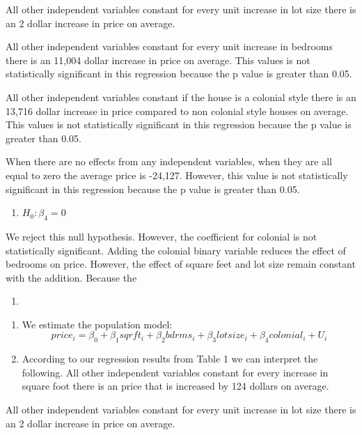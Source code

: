 \documentclass[
  12pt,
  landscape]{article}
\providecommand{\tightlist}{%
  \setlength{\itemsep}{0pt}\setlength{\parskip}{0pt}}
\begin{document}
All other independent variables constant for every unit increase in lot
size there is an 2 dollar increase in price on average.

All other independent variables constant for every unit increase in
bedrooms there is an 11,004 dollar increase in price on average. This
values is not statistically significant in this regression because the p
value is greater than 0.05.

All other independent variables constant if the house is a colonial
style there is an 13,716 dollar increase in price compared to non
colonial style houses on average. This values is not statistically
significant in this regression because the p value is greater than 0.05.

When there are no effects from any independent variables, when they are
all equal to zero the average price is -24,127. However, this value is
not statistically significant in this regression because the p value is
greater than 0.05.

\begin{enumerate}
\def\labelenumi{\roman{enumi})}
\setcounter{enumi}{2}
\tightlist
\item
  \({H_0: \beta_4 = 0}\)
\end{enumerate}

We reject this null hypothesis. However, the coefficient for colonial is
not statistically significant. Adding the colonial binary variable
reduces the effect of bedrooms on price. However, the effect of square
feet and lot size remain constant with the addition. Because the

\begin{enumerate}
\def\labelenumi{(\alph{enumi})}
\setcounter{enumi}{4}
\item
\end{enumerate}

\begin{enumerate}
\def\labelenumi{\roman{enumi})}
\tightlist
\item
  We estimate the population model: \[
  price_i = \beta_0 + \beta_1sqrft_i + \beta_2bdrms_i + \beta_3lotsize_i + \beta_4colonial_i + U_i
  \]
\item
  According to our regression results from Table 1 we can interpret the
  following. All other independent variables constant for every increase
  in square foot there is an price that is increased by 124 dollars on
  average.
\end{enumerate}

All other independent variables constant for every unit increase in lot
size there is an 2 dollar increase in price on average.
\end{document}
